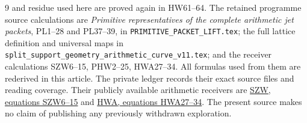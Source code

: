 \documentclass[11pt,a4paper]{article}
\theoremstyle{definition}\newtheorem{definition}[theorem]{Definition}
\begin{document}
\begin{thebibliography}{9}
and residue used here are proved again in HW61--64.
The retained programme source calculations are
\emph{Primitive representatives of the complete arithmetic jet packets},
PL1--28 and PL37--39, in
\texttt{PRIMITIVE\_PACKET\_LIFT.tex};
the full lattice definition and universal maps in
\texttt{split\_support\_geometry\_arithmetic\_curve\_v11.tex};
and the receiver calculations SZW6--15,
PHW2--25, HWA27--34.
All formulas used from them are rederived in this article.
The private ledger records their exact source files and reading
coverage. Their publicly available arithmetic receivers are
\href{https://github.com/KokunoYumeto/zeta-function-research-reader/blob/adfbfe74fa49e31cb7aa068cf755fb083be37c32/workbenches/splitzero-tandem/branches/tau-zero-prime-positivity/SUPPORTED_ZERO_PRIME_WEIL_DERIVATION.md}
{SZW, equations SZW6--15}
and
\href{https://github.com/KokunoYumeto/zeta-function-research-reader/blob/d5c9d198a8432e3ede468b280162a99c00e3f4f7/workbenches/splitzero-tandem/branches/tau-zero-prime-positivity/HOLONOMY_AVERAGING_WEIL_ENDPOINT_DERIVATION.md}
{HWA, equations HWA27--34}.
The present source makes no claim of publishing any previously
withdrawn exploration.

\end{thebibliography}
\end{document}

